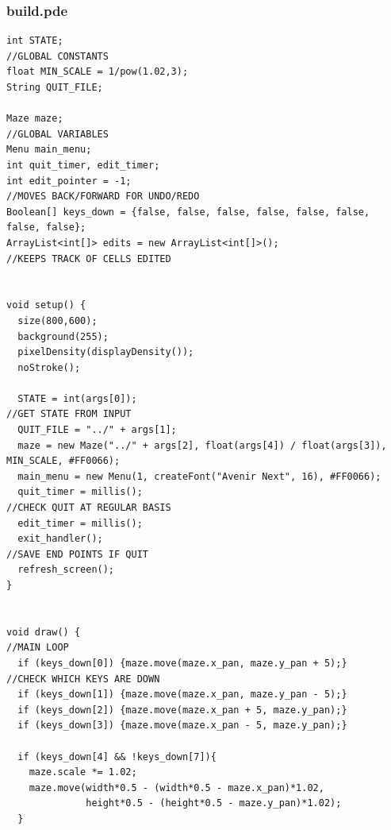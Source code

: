 \documentclass[titlepage]{article}
\begin{document}
\subsubsection{build.pde}
\begin{changemargin}{-1in}{-1in} 
\begin{verbatim}
int STATE;                                                                      //GLOBAL CONSTANTS
float MIN_SCALE = 1/pow(1.02,3);
String QUIT_FILE; 

Maze maze;                                                                      //GLOBAL VARIABLES
Menu main_menu;
int quit_timer, edit_timer;
int edit_pointer = -1;                                                          //MOVES BACK/FORWARD FOR UNDO/REDO
Boolean[] keys_down = {false, false, false, false, false, false, false, false};
ArrayList<int[]> edits = new ArrayList<int[]>();                                //KEEPS TRACK OF CELLS EDITED


void setup() {
  size(800,600);
  background(255);
  pixelDensity(displayDensity());
  noStroke();

  STATE = int(args[0]);                                                         //GET STATE FROM INPUT
  QUIT_FILE = "../" + args[1];  
  maze = new Maze("../" + args[2], float(args[4]) / float(args[3]), MIN_SCALE, #FF0066);
  main_menu = new Menu(1, createFont("Avenir Next", 16), #FF0066);
  quit_timer = millis();                                                        //CHECK QUIT AT REGULAR BASIS 
  edit_timer = millis();
  exit_handler();                                                               //SAVE END POINTS IF QUIT
  refresh_screen();
} 


void draw() {                                                                   //MAIN LOOP
  if (keys_down[0]) {maze.move(maze.x_pan, maze.y_pan + 5);}                    //CHECK WHICH KEYS ARE DOWN
  if (keys_down[1]) {maze.move(maze.x_pan, maze.y_pan - 5);}
  if (keys_down[2]) {maze.move(maze.x_pan + 5, maze.y_pan);}
  if (keys_down[3]) {maze.move(maze.x_pan - 5, maze.y_pan);}

  if (keys_down[4] && !keys_down[7]){
    maze.scale *= 1.02;
    maze.move(width*0.5 - (width*0.5 - maze.x_pan)*1.02, 
              height*0.5 - (height*0.5 - maze.y_pan)*1.02);
  }


\end{verbatim}
\end{changemargin}
\end{document}
